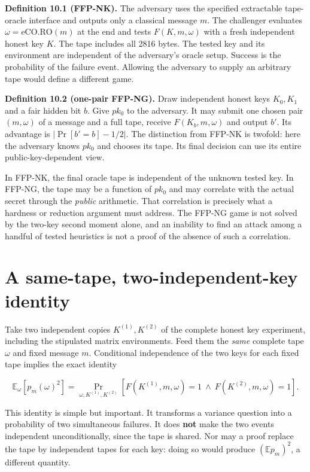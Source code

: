 \documentclass[
  11pt,
  a4paper,
  oneside]{report}
\begin{document}
\textbf{Definition 10.1 (FFP-NK).} The adversary uses the specified
extractable tape-oracle interface and outputs only a classical message
\(m\). The challenger evaluates \(\omega=\mathrm{eCO.RO}(m)\) at the end
and tests \(F(K,m,\omega)\) with a fresh independent honest key \(K\).
The tape includes all 2816 bytes. The tested key and its environment are
independent of the adversary's oracle setup. Success is the probability
of the failure event. Allowing the adversary to supply an arbitrary tape
would define a different game.

\textbf{Definition 10.2 (one-pair FFP-NG).} Draw independent honest keys
\(K_0,K_1\) and a fair hidden bit \(b\). Give \(pk_0\) to the adversary.
It may submit one chosen pair \((m,\omega)\) of a message and a full
tape, receive \(F(K_b,m,\omega)\) and output \(b'\). Its advantage is
\(|\Pr[b'=b]-1/2|\). The distinction from FFP-NK is twofold: here the
adversary knows \(pk_0\) and chooses its tape. Its final decision can
use its entire public-key-dependent view.

In FFP-NK, the final oracle tape is independent of the unknown tested
key. In FFP-NG, the tape may be a function of \(pk_0\) and may correlate
with the actual secret through the \emph{public} arithmetic. That
correlation is precisely what a hardness or reduction argument must
address. The FFP-NG game is not solved by the two-key second moment
alone, and an inability to find an attack among a handful of tested
heuristics is not a proof of the absence of such a correlation.

\section{A same-tape, two-independent-key
identity}\label{a-same-tape-two-independent-key-identity}

Take two independent copies \(K^{(1)},K^{(2)}\) of the complete honest
key experiment, including the stipulated matrix environments. Feed them
the \emph{same} complete tape \(\omega\) and fixed message \(m\).
Conditional independence of the two keys for each fixed tape implies the
exact identity

\[
\mathbb E_\omega[p_m(\omega)^2]
=\Pr_{\omega,K^{(1)},K^{(2)}}
[F(K^{(1)},m,\omega)=1\ \wedge\ F(K^{(2)},m,\omega)=1].
\]

This identity is simple but important. It transforms a variance question
into a probability of two simultaneous failures. It does \textbf{not}
make the two events independent unconditionally, since the tape is
shared. Nor may a proof replace the tape by independent tapes for each
key: doing so would produce \((\mathbb E p_m)^2\), a different quantity.
\end{document}
